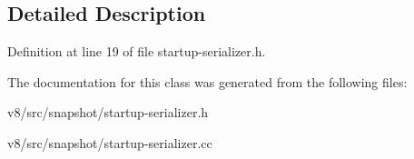 \subsection{Detailed Description}


Definition at line 19 of file startup-\/serializer.\+h.



The documentation for this class was generated from the following files\+:\begin{DoxyCompactItemize}
\item 
v8/src/snapshot/startup-\/serializer.\+h\item 
v8/src/snapshot/startup-\/serializer.\+cc\end{DoxyCompactItemize}
